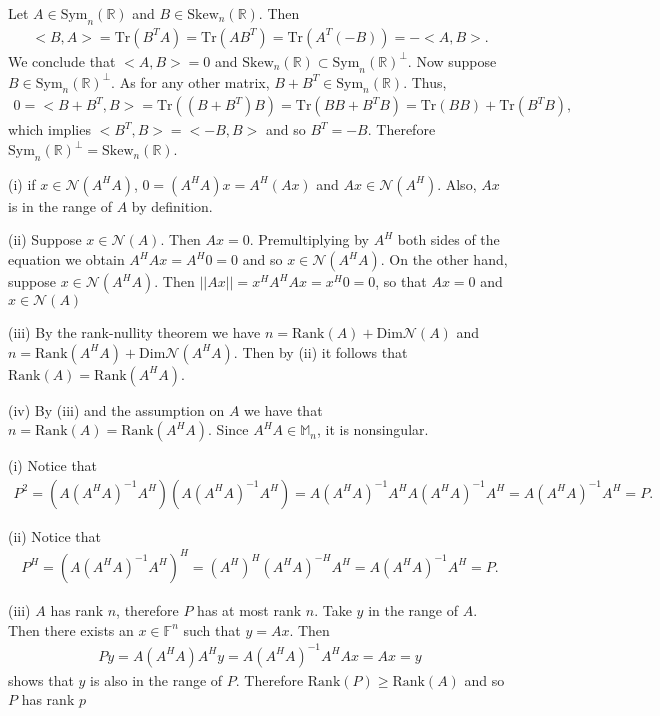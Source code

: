 \documentclass[letterpaper,12pt]{article}
\theoremstyle{definition}
\newenvironment{problem}[2][Problem]{\begin{trivlist}
\item[\hskip \labelsep {\bfseries #1}\hskip \labelsep {\bfseries #2.}]}{\end{trivlist}}
\begin{document}
\begin{problem}{44}
\end{problem} \begin{problem}{45}
Let $A\in\text{Sym}_n(\mathbb R)$ and $B\in\text{Skew}_n(\mathbb R)$.
Then
\begin{align*}
    <B,A>=\text{Tr}(B^TA)=\text{Tr}(AB^T)=
    \text{Tr}(A^T(-B))=-<A,B>.
\end{align*}
We conclude that $<A,B>=0$ and $\text{Skew}_n(\mathbb R)\subset\text{Sym}_n(\mathbb R)^\perp$.
Now suppose $B\in\text{Sym}_n(\mathbb R)^\perp$.
As for any other matrix, $B+B^T\in\text{Sym}_n(\mathbb R)$.
Thus,
\begin{align*}
    0 = <B+B^T,B>=\text{Tr}((B+B^T)B) =\text{Tr}(BB + B^TB)=
    \text{Tr}(BB)+\text{Tr}(B^TB),
\end{align*}
which implies $<B^T,B>=<-B,B>$ and so $B^T=-B$.
Therefore $\text{Sym}_n(\mathbb R)^\perp=\text{Skew}_n(\mathbb R)$.

\end{problem} \begin{problem}{46}
(i)
if $x\in\mathcal N(A^HA)$, $0=(A^HA)x=A^H(Ax)$ and $Ax\in\mathcal N(A^H)$.
Also, $Ax$ is in the range of $A$ by definition.

(ii)
Suppose $x\in\mathcal N(A)$.
Then $Ax=0$.
Premultiplying by $A^H$ both sides of the equation we obtain $A^HAx=A^H0=0$
and so $x\in\mathcal N(A^HA)$.
On the other hand, suppose $x\in\mathcal N(A^HA)$.
Then $||Ax||=x^HA^HAx=x^H0=0$, so that $Ax=0$ and $x\in\mathcal N(A)$

(iii)
By the rank-nullity theorem we have $n=\text{Rank}(A)+\text{Dim}\mathcal N(A)$
and $n=\text{Rank}(A^HA)+\text{Dim}\mathcal N(A^HA)$.
Then by (ii) it follows that $\text{Rank}(A)=\text{Rank}(A^HA)$.

(iv)
By (iii) and the assumption on $A$ we have that $n=\text{Rank}(A)=\text{Rank}(A^HA)$.
Since $A^HA\in\mathbb M_n$, it is nonsingular.

\end{problem} \begin{problem}{47}
(i)
Notice that
\begin{align*}
    P^2=(A(A^HA)^{-1}A^H)(A(A^HA)^{-1}A^H)=
    A(A^HA)^{-1}A^HA(A^HA)^{-1}A^H=
    A(A^HA)^{-1}A^H=P.
\end{align*}

(ii)
Notice that
\begin{align*}
    P^H=(A(A^HA)^{-1}A^H)^H=
    (A^H)^H(A^HA)^{-H}A^H=A(A^HA)^{-1}A^H=P.
\end{align*}

(iii)
$A$ has rank $n$, therefore $P$ has at most rank $n$.
Take $y$ in the range of $A$.
Then there exists an $x\in\mathbb F^n$ such that $y=Ax$.
Then
\begin{align*}
    Py=A(A^HA)A^Hy=A(A^HA)^{-1}A^HAx=Ax=y
\end{align*}
shows that $y$ is also in the range of $P$.
Therefore $\text{Rank}(P)\geq\text{Rank}(A)$ and so $P$ has rank $p$


\end{problem}
\end{document}
